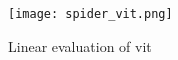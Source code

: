 \begin{figure}[H]
    \begin{center}
    \texttt{[image: spider\_vit.png]}
    \caption{Linear evaluation of \gls{vit}}\label{fig:spider_vit}
    \end{center}
\end{figure}




